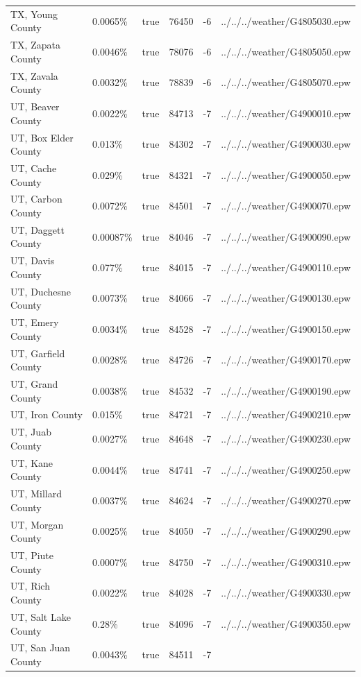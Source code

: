 \begin{longtable}[]{@{}llllll@{}}
TX, Young County & 0.0065\% & true & 76450 & -6 &
../../../weather/G4805030.epw \\
TX, Zapata County & 0.0046\% & true & 78076 & -6 &
../../../weather/G4805050.epw \\
TX, Zavala County & 0.0032\% & true & 78839 & -6 &
../../../weather/G4805070.epw \\
UT, Beaver County & 0.0022\% & true & 84713 & -7 &
../../../weather/G4900010.epw \\
UT, Box Elder County & 0.013\% & true & 84302 & -7 &
../../../weather/G4900030.epw \\
UT, Cache County & 0.029\% & true & 84321 & -7 &
../../../weather/G4900050.epw \\
UT, Carbon County & 0.0072\% & true & 84501 & -7 &
../../../weather/G4900070.epw \\
UT, Daggett County & 0.00087\% & true & 84046 & -7 &
../../../weather/G4900090.epw \\
UT, Davis County & 0.077\% & true & 84015 & -7 &
../../../weather/G4900110.epw \\
UT, Duchesne County & 0.0073\% & true & 84066 & -7 &
../../../weather/G4900130.epw \\
UT, Emery County & 0.0034\% & true & 84528 & -7 &
../../../weather/G4900150.epw \\
UT, Garfield County & 0.0028\% & true & 84726 & -7 &
../../../weather/G4900170.epw \\
UT, Grand County & 0.0038\% & true & 84532 & -7 &
../../../weather/G4900190.epw \\
UT, Iron County & 0.015\% & true & 84721 & -7 &
../../../weather/G4900210.epw \\
UT, Juab County & 0.0027\% & true & 84648 & -7 &
../../../weather/G4900230.epw \\
UT, Kane County & 0.0044\% & true & 84741 & -7 &
../../../weather/G4900250.epw \\
UT, Millard County & 0.0037\% & true & 84624 & -7 &
../../../weather/G4900270.epw \\
UT, Morgan County & 0.0025\% & true & 84050 & -7 &
../../../weather/G4900290.epw \\
UT, Piute County & 0.0007\% & true & 84750 & -7 &
../../../weather/G4900310.epw \\
UT, Rich County & 0.0022\% & true & 84028 & -7 &
../../../weather/G4900330.epw \\
UT, Salt Lake County & 0.28\% & true & 84096 & -7 &
../../../weather/G4900350.epw \\
UT, San Juan County & 0.0043\% & true & 84511 & -7 &

\end{longtable}
